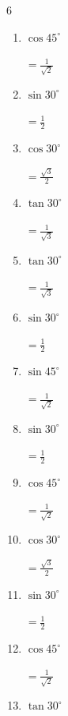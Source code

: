 \begin{multicols}{6}
\begin{enumerate}
        $\displaystyle =1$

  \item $\displaystyle \cos{45^\circ}$

        $\displaystyle =\frac{1}{\sqrt{2}}$

  \item $\displaystyle \sin{30^\circ}$

        $\displaystyle =\frac{1}{2}$

  \item $\displaystyle \cos{30^\circ}$

        $\displaystyle =\frac{\sqrt{3}}{2}$

  \item $\displaystyle \tan{30^\circ}$

        $\displaystyle =\frac{1}{\sqrt{3}}$

  \item $\displaystyle \tan{30^\circ}$

        $\displaystyle =\frac{1}{\sqrt{3}}$

  \item $\displaystyle \sin{30^\circ}$

        $\displaystyle =\frac{1}{2}$

  \item $\displaystyle \sin{45^\circ}$

        $\displaystyle =\frac{1}{\sqrt{2}}$

  \item $\displaystyle \sin{30^\circ}$

        $\displaystyle =\frac{1}{2}$

  \item $\displaystyle \cos{45^\circ}$

        $\displaystyle =\frac{1}{\sqrt{2}}$

  \item $\displaystyle \cos{30^\circ}$

        $\displaystyle =\frac{\sqrt{3}}{2}$

\columnbreak %

  \item $\displaystyle \sin{30^\circ}$

        $\displaystyle =\frac{1}{2}$

  \item $\displaystyle \cos{45^\circ}$

        $\displaystyle =\frac{1}{\sqrt{2}}$

  \item $\displaystyle \tan{30^\circ}$


\end{enumerate}
\end{multicols}
